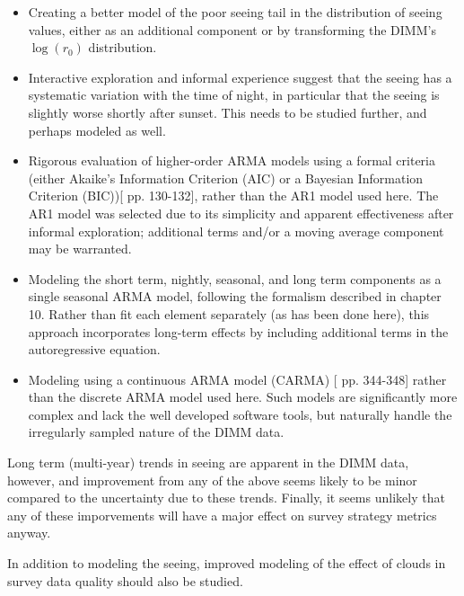 \documentclass[\docopts]{\docclass}
\begin{document}
\begin{itemize}

\item Creating a better model of the poor seeing tail in the
  distribution of seeing values, either as an additional component or
  by transforming the DIMM's $\log(r_0)$ distribution.

\item Interactive exploration and informal experience suggest that the
  seeing has a systematic variation with the time of night, in
  particular that the seeing is slightly worse shortly after
  sunset. This needs to be studied further, and perhaps modeled as
  well.

\item Rigorous evaluation of higher-order ARMA models using a formal
  criteria (either Akaike's Information Criterion (AIC) or a Bayesian
  Information Criterion (BIC))[\cite{cryer_time_2008} pp. 130-132],
  rather than the AR1 model used here. The AR1 model was selected due
  to its simplicity and apparent effectiveness after informal
  exploration; additional terms and/or a moving average component may
  be warranted.

\item Modeling the short term, nightly, seasonal, and long term
  components as a single seasonal ARMA model, following the formalism
  described in \cite{cryer_time_2008} chapter 10. Rather than fit each
  element separately (as has been done here), this approach
  incorporates long-term effects by including additional terms in the
  autoregressive equation.
  
\item Modeling using a continuous ARMA model (CARMA)
  [\cite{brockwell_introduction_1996} pp. 344-348] rather than the
  discrete ARMA model used here. Such models are significantly more
  complex and lack the well developed software tools, but naturally
  handle the irregularly sampled nature of the DIMM data.
  
\end{itemize}

Long term (multi-year) trends in seeing are apparent in the DIMM data,
however, and improvement from any of the above seems likely to be
minor compared to the uncertainty due to these trends. Finally, it
seems unlikely that any of these imporvements will have a major effect
on survey strategy metrics anyway.

In addition to modeling the seeing, improved modeling of the effect of
clouds in survey data quality should also be studied.
\end{document}
